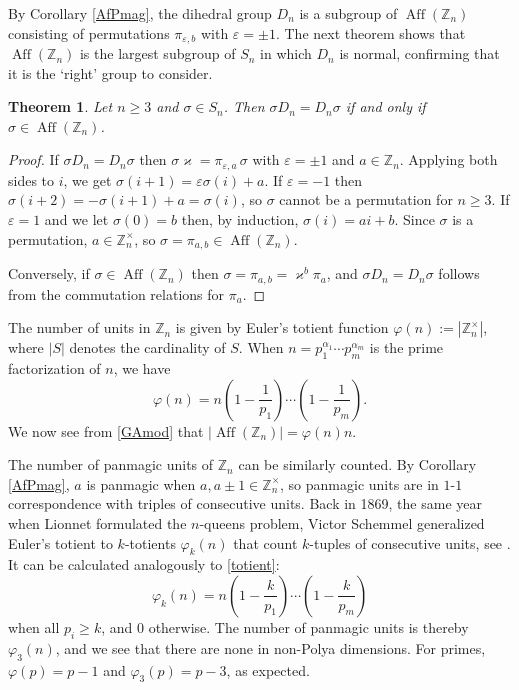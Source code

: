 \documentclass[11pt]{article}
\theoremstyle{plain}
\newtheorem{theorem}{Theorem}
\theoremstyle{definition}
\newcommand{\+}[1]{{#1}^\times}
\def\Aff{\operatorname{Aff}}
\def\Z{{\mathbb Z}}
\def\a{{\alpha}}
\def\s{{\sigma}}
\def\k{{\varkappa}}
\def\pfi{{\varphi}}
\def\e{{\varepsilon}}
\begin{document}
By Corollary \ref{AfPmag}, the dihedral group $D_n$ is a subgroup of $\Aff(\Z_n)$ consisting of permutations $\pi_{\e,b}$ with $\e=\pm1$. The next theorem shows that $\Aff(\Z_n)$ is the largest subgroup of $S_n$ in which $D_n$ is normal, confirming that it is the `right' group to consider.
\begin{theorem}\label{NormDn} Let $n\geq3$ and $\s\in S_n$. Then $\s D_n=D_n\s$ if and only if $\s\in \Aff(\Z_n)$.
\end{theorem}
\begin{proof} If $\s D_n=D_n\s$ then $\s\k=\pi_{\e,a}\,\s$ with $\e=\pm1$ and $a\in\Z_n$. Applying both sides to $i$, we get $\s(i+1)=\e\s(i)+a$. If $\e=-1$ then $\s(i+2)=-\s(i+1)+a=\s(i)$, so $\s$ cannot be a permutation for $n\geq3$. If $\e=1$ and we let $\s(0)=b$ then, by induction, $\s(i)=ai+b$. Since $\s$ is a permutation, $a\in\+{\Z}_n$, so $\s=\pi_{a,b}\in \Aff(\Z_n)$. 

Conversely, if $\s\in \Aff(\Z_n)$ then $\s=\pi_{a,b}=\k^b\pi_a$, and $\s D_n=D_n\s$ follows from the commutation relations for $\pi_a$.
\end{proof}
The number of units in $\Z_n$ is given by Euler's totient function $\pfi(n):=|\+{\Z}_n|$, where $|S|$ denotes the cardinality of $S$. When $n=p_1^{\a_1}\cdots p_m^{\a_m}$ is the prime factorization of $n$, we have \cite{Rosen}
\begin{equation}\label{totient}
\pfi(n)=n\left(1-\frac1{p_1}\right)\cdots\left(1-\frac1{p_m}\right).
\end{equation}
We now see from \eqref{GAmod} that $|\Aff(\Z_n)|=\pfi(n)n$. 

The number of panmagic units of $\Z_n$ can be similarly counted. By Corollary \ref{AfPmag}, $a$ is panmagic when  $a,a\pm1\in\+{\Z}_n$, so panmagic units are in $1$-$1$ correspondence with triples of consecutive units. Back in 1869, the same year when Lionnet formulated the $n$-queens problem, Victor Schemmel generalized Euler's totient to $k$-totients $\pfi_k(n)$ that count $k$-tuples of consecutive units, see \cite{Lehm}. It can be calculated analogously to  \eqref{totient}: 
\begin{equation}\label{ktotient}
\pfi_k(n)=n\left(1-\frac{k}{p_1}\right)\cdots\left(1-\frac{k}{p_m}\right)
\end{equation}
when all $p_i\geq k$, and $0$ otherwise. The number of panmagic units is thereby $\pfi_3(n)$, and we see that there are none in non-Polya dimensions. For primes, $\pfi(p)=p-1$ and $\pfi_3(p)=p-3$, as expected.
\end{document}
